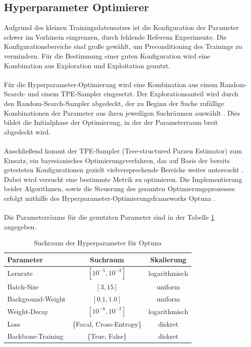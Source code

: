 \documentclass[12pt,DIV=15,BCOR=15mm,twoside,headsepline,abstract=true,listof=totoc,bibliography=totoc]{scrreprt}
\theoremstyle{remark}    %
\begin{document}
    \subsection{Hyperparameter Optimierer}
    Aufgrund des kleinen Trainingsdatensatzes ist die Konfiguration der Parameter schwer im Vorhinein eingrenzen, durch fehlende Referenz Experimente.
    Die Konfigurationsbereiche sind große gewählt, um Preconditioning des Trainings zu vermindern. Für die Bestimmung einer guten Konfiguration wird
    eine Kombination aus Exploration und Exploitation genutzt.\\\\
    Für die Hyperparameter-Optimierung wird eine Kombination aus einem Random-Search- und einem TPE-Sampler eingesetzt.
    Der Explorationsanteil wird durch den Random-Search-Sampler abgedeckt, der zu Beginn der Suche zufällige Kombinationen der Parameter aus ihren jeweiligen 
    Suchräumen auswählt \cite{akiba2019optunanextgenerationhyperparameteroptimization}. Dies bildet die Initialphase der Optimierung, in der der Parameterraum breit 
    abgedeckt wird. \\\\
    Anschließend kommt der TPE-Sampler (Tree-structured Parzen Estimator) zum Einsatz, ein bayesianisches Optimierungsverfahren, das auf Basis der bereits 
    getesteten Konfigurationen gezielt vielversprechende Bereiche weiter untersucht \cite{watanabe2023treestructuredparzenestimatorunderstanding}. 
    Dabei wird versucht eine bestimmte Metrik zu optimieren.
    Die Implementierung beider Algorithmen, sowie die Steuerung des gesamten Optimierungsprozesses erfolgt mithilfe des Hyperparameter-Optimierungsframeworks 
    Optuna \cite{akiba2019optunanextgenerationhyperparameteroptimization}.\\\\
    Die Parameterräume für die genutzten Parameter sind in der Tabelle \ref{tab:param_search} angegeben.

    \begin{table}[ht]
        \centering
        \caption{Suchraum der Hyperparameter für Optuna}
        \label{tab:param_search}
        \setlength{\tabcolsep}{8pt}
        \renewcommand{\arraystretch}{1.2}
        \begin{tabular}{lcc}
            \toprule
            \textbf{Parameter} & \textbf{Suchraum} & \textbf{Skalierung} \\
            \midrule
            Lernrate & $[10^{-5}, 10^{-2}]$ & logarithmisch \\
            Batch-Size & $[3, 15]$ & uniform \\
            Background-Weight & $[0.1, 1.0]$ & uniform \\
            Weight-Decay & $[10^{-6}, 10^{-2}]$ & logarithmisch \\
            Loss & \{Focal, Cross-Entropy\} & diskret \\
            Backbone-Training & \{True, False\} & diskret \\
            \bottomrule
        \end{tabular}
    \end{table}
\end{document}
